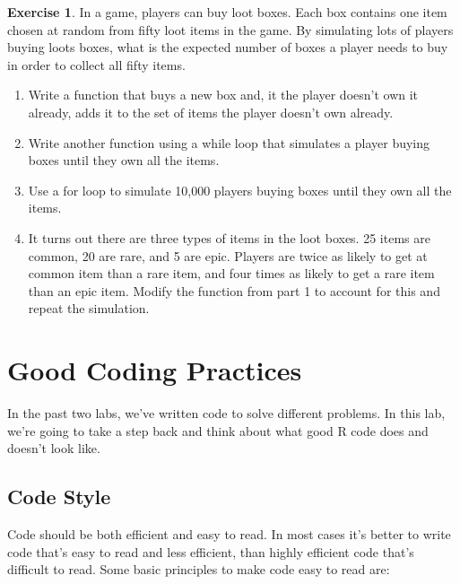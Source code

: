 \documentclass[
]{book}
\theoremstyle{definition}
\theoremstyle{definition}
\theoremstyle{definition}
\newtheorem{exercise}{Exercise}[chapter]
\theoremstyle{definition}
\theoremstyle{remark}
\begin{document}
\begin{exercise}

In a game, players can buy loot boxes. Each box contains one item chosen at random from fifty loot items in the game. By simulating lots of players buying loots boxes, what is the expected number of boxes a player needs to buy in order to collect all fifty items.

\begin{enumerate}
\def\labelenumi{\arabic{enumi}.}
\item
  Write a function that buys a new box and, it the player doesn't own it already, adds it to the set of items the player doesn't own already.
\item
  Write another function using a while loop that simulates a player buying boxes until they own all the items.
\item
  Use a for loop to simulate 10,000 players buying boxes until they own all the items.
\item
  It turns out there are three types of items in the loot boxes. 25 items are common, 20 are rare, and 5 are epic. Players are twice as likely to get at common item than a rare item, and four times as likely to get a rare item than an epic item. Modify the function from part 1 to account for this and repeat the simulation.
\end{enumerate}

\end{exercise}

\hypertarget{good-coding-practices}{%
\section{Good Coding Practices}\label{good-coding-practices}}

In the past two labs, we've written code to solve different problems. In this lab, we're going to take a step back and think about what good R code does and doesn't look like.

\hypertarget{code-style}{%
\subsection{Code Style}\label{code-style}}

Code should be both efficient and easy to read. In most cases it's better to write code that's easy to read and less efficient, than highly efficient code that's difficult to read. Some basic principles to make code easy to read are:
\end{document}
